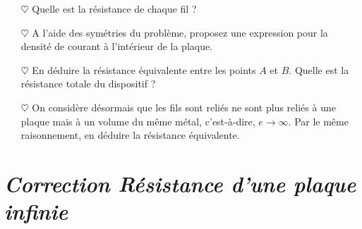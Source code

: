 \documentclass{report}
\begin{document}
\begin{itemize}

	\item[$\heartsuit$] Quelle est la résistance de chaque fil ? 
	
	\item[$\heartsuit$] A l'aide des symétries du problème, proposez une expression pour la densité de courant à l'intérieur de la plaque. 
	
	\item[$\heartsuit$] En déduire la résistance équivalente entre les points $A$ et $B$. Quelle est la résistance totale du dispositif ?
	
	\item[$\heartsuit$] On considère désormais que les fils sont reliés ne sont plus reliés à une plaque mais à un volume du même métal, c'est-à-dire, $e\longrightarrow\infty$. Par le même raisonnement, en déduire la résistance équivalente. 

\end{itemize}

\newpage

\section*{\textit{Correction Résistance d'une plaque infinie}}
\end{document}
